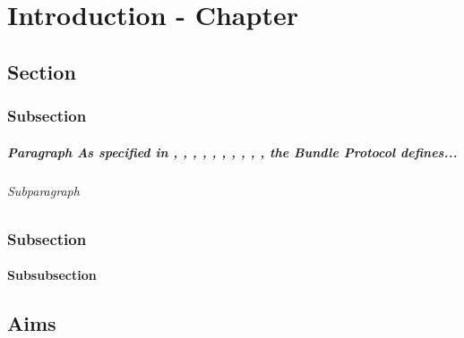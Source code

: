 \chapter{Introduction - Chapter}
\section{Section}

\subsection{Subsection}
\paragraph{Paragraph
As specified in 
\cite{rfc9171}, 
\cite{rfc4838}, 
\cite{rfc5598}, 
\cite{rfc6238}, 
\cite{rfc6749}, 
\cite{rfc7208}, 
\cite{rfc6376}, 
\cite{fall2003delay}, 
\cite{jain2004routing}, 
\cite{rfc5321}, 
the Bundle Protocol defines...}
\subparagraph{Subparagraph}

\subsection{Subsection}

\subsubsection{Subsubsection}

\section{Aims}